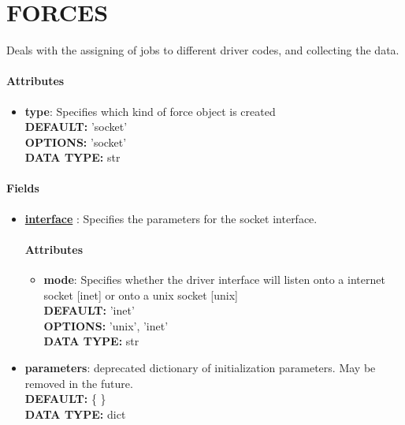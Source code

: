 \section{FORCES}
\label{FORCES}
Deals with the assigning of jobs to different driver codes, and collecting the data.
\paragraph{Attributes}
 \begin{itemize}
\item {\bf type}:
 Specifies which kind of force object is created
{\\ \bf DEFAULT: }'socket'
{\\ \bf OPTIONS: }'socket'
{\\ \bf DATA TYPE: }str
\end{itemize}
 
\paragraph{Fields}
 \begin{itemize}
\item {\bf \hyperref[INTERFACE]{interface} }:
 Specifies the parameters for the socket interface.
\paragraph{Attributes}
 \begin{itemize}
\item {\bf mode}:
 Specifies whether the driver interface will listen onto a internet socket [inet] or onto a unix socket [unix]
{\\ \bf DEFAULT: }'inet'
{\\ \bf OPTIONS: }'unix', 'inet'
{\\ \bf DATA TYPE: }str
\end{itemize}
 
\item {\bf parameters}:
 deprecated dictionary of initialization parameters. May be removed in the future.
{\\ \bf DEFAULT: }\{ \}
{\\ \bf DATA TYPE: }dict
\end{itemize}
 
